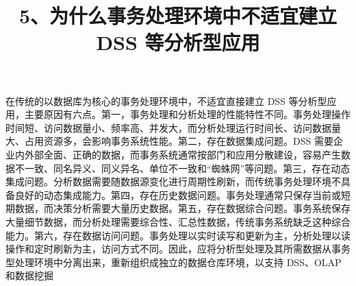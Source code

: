 \documentclass[UTF8,zihao=-4]{ctexart}
\begin{document}
\title{5、为什么事务处理环境中不适宜建立 DSS 等分析型应用}
\author{}
\date{}
\maketitle

在传统的以数据库为核心的事务处理环境中，不适宜直接建立 DSS 等分析型应用，主要原因有六点。第一，事务处理和分析处理的性能特性不同。事务处理操作时间短、访问数据量小、频率高、并发大，而分析处理运行时间长、访问数据量大、占用资源多，会影响事务系统性能。第二，存在数据集成问题。DSS 需要企业内外部全面、正确的数据，而事务系统通常按部门和应用分散建设，容易产生数据不一致、同名异义、同义异名、单位不一致和“蜘蛛网”等问题。第三，存在动态集成问题。分析数据需要随数据源变化进行周期性刷新，而传统事务处理环境不具备良好的动态集成能力。第四，存在历史数据问题。事务处理通常只保存当前或短期数据，而决策分析需要大量历史数据。第五，存在数据综合问题。事务系统保存大量细节数据，而分析处理需要综合性、汇总性数据，传统事务系统缺乏这种综合能力。第六，存在数据访问问题。事务处理以实时读写和更新为主，分析处理以读操作和定时刷新为主，访问方式不同。因此，应将分析型处理及其所需数据从事务型处理环境中分离出来，重新组织成独立的数据仓库环境，以支持 DSS、OLAP 和数据挖掘\par
\end{document}
